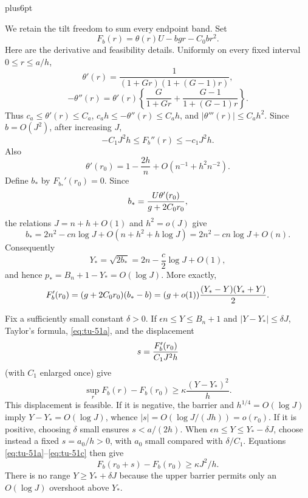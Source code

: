 \documentclass[12pt,reqno]{amsart}
\makeatletter
\theoremstyle{plain}
\theoremstyle{definition}
\theoremstyle{remark}
\renewenvironment{proof}[1][\proofname]{%
  \par
  \pushQED{\qed}%
  \normalfont
  \topsep6pt plus6pt\relax
  \trivlist
  \item[\hskip\labelsep\slshape #1\@addpunct{.}]%
  \ignorespaces
}{%
  \popQED
  \endtrivlist
  \@endpefalse
}
\DeclareRobustCommand{\qed}{%
  \leavevmode\unskip\penalty9999\hbox{}\nobreak
  \ifmmode
    \makebox[0pt][l]{\qquad\hbox{\qedsymbol}}%
  \else
    \qquad\hbox{\qedsymbol}%
  \fi
}
\renewcommand{\qedsymbol}{\rule[.47pt]{4pt}{6pt}}
\numberwithin{equation}{section}
\makeatother
\begin{document}
\begin{proof}[Proof of Lemma~\ref{lem:terminal-feynman-kac}]
We retain the tilt freedom to sum every endpoint band.  Set
\[
       F_b(r)=\theta(r)U-bgr-C_0br^2.
\]
Here are the derivative and feasibility details.  Uniformly on every fixed
interval \(0\le r\le a/h\),
\[
 \theta'(r)=\frac1{(1+Gr)(1+(G-1)r)},
\]
\[
 -\theta''(r)=\theta'(r)
 \left\{\frac G{1+Gr}+\frac{G-1}{1+(G-1)r}\right\}.
\]
Thus \(c_a\le\theta'(r)\le C_a\),
\(c_ah\le-\theta''(r)\le C_ah\), and
\(|\theta'''(r)|\le C_ah^2\).  Since \(b=O(J^2)\), after increasing
\(J\),
\begin{equation}
       -C_1J^2h\le F_b''(r)\le-c_1J^2h.                     \label{eq:tu-51a}
\end{equation}
Also
\begin{equation}
 \theta'(r_0)=1-\frac{2h}{n}
                  +O(n^{-1}+h^2n^{-2}).                     \label{eq:tu-51b}
\end{equation}
Define \(b_*\) by \(F_{b_*}'(r_0)=0\).  Since
\[
       b_*={U\theta'(r_0)\over g+2C_0r_0},
\]
the relations \(J=n+h+O(1)\) and \(h^2=o(J)\) give
\[
 b_*=2n^2-cn\log J+O(n+h^2+h\log J)
     =2n^2-cn\log J+O(n).
\]
Consequently
\begin{equation}
       Y_*=\sqrt{2b_*}
          =2n-\frac c2\log J+O(1),                            \label{eq:tu-51-2}
\end{equation}
and hence \(p_*=B_n+1-Y_*=O(\log J)\).  More exactly,
\begin{equation}
 F_b'(r_0)=(g+2C_0r_0)(b_*-b)
          =(g+o(1)){(Y_*-Y)(Y_*+Y)\over2}.                  \label{eq:tu-51c}
\end{equation}

Fix a sufficiently small constant \(\delta>0\).  If
\(\epsilon n\le Y\le B_n+1\) and \(|Y-Y_*|\le\delta J\), Taylor's
formula, \eqref{eq:tu-51a}, and the displacement
\[
       s={F_b'(r_0)\over C_1J^2h}
\]
(with \(C_1\) enlarged once) give
\begin{equation}
 \sup_rF_b(r)-F_b(r_0)
 \ge\kappa\frac{(Y-Y_*)^2}{h}.                              \label{eq:tu-51d}
\end{equation}
This displacement is feasible.  If it is negative, the barrier and
\(h^{1/4}=O(\log J)\) imply \(Y-Y_*=O(\log J)\), whence
\(|s|=O(\log J/(Jh))=o(r_0)\).  If it is positive, choosing \(\delta\)
small ensures \(s<a/(2h)\).  When
\(\epsilon n\le Y\le Y_*-\delta J\), choose instead a fixed
\(s=a_0/h>0\), with \(a_0\) small compared with \(\delta/C_1\).
Equations \eqref{eq:tu-51a}--\eqref{eq:tu-51c} then give
\begin{equation}
       F_b(r_0+s)-F_b(r_0)\ge\kappa J^2/h.                  \label{eq:tu-51e}
\end{equation}
There is no range \(Y\ge Y_*+\delta J\) because the upper barrier permits
only an \(O(\log J)\) overshoot above \(Y_*\).


\end{proof}
\end{document}
